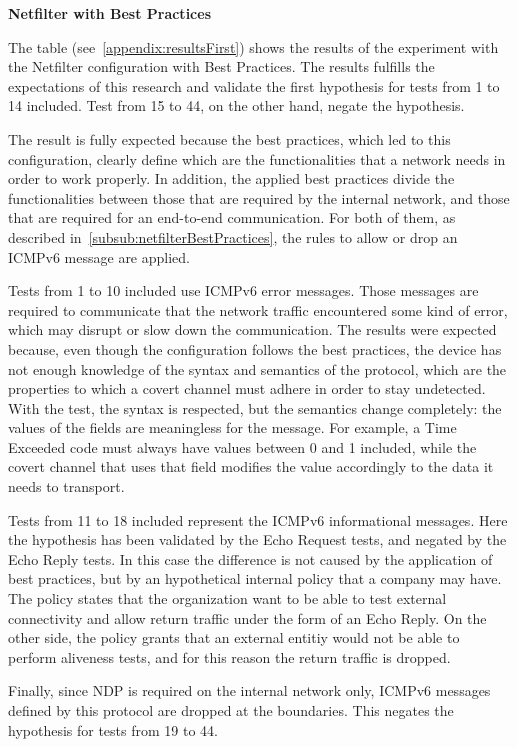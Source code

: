 \documentclass[12pt]{article}
\begin{document}
\textbf{Netfilter with Best Practices}
\label{resultsFirstNetfilterBest}

The table (see~\cref{appendix:resultsFirst}) shows the results of the experiment with the Netfilter configuration with Best Practices. The results fulfills the expectations of this research and validate the first hypothesis for tests from 1 to 14 included. Test from 15 to 44, on the other hand, negate the hypothesis.

The result is fully expected because the best practices, which led to this configuration, clearly define which are the functionalities that a network needs in order to work properly. In addition, the applied best practices divide the functionalities between those that are required by the internal network, and those that are required for an end-to-end communication. For both of them, as described in~\cref{subsub:netfilterBestPractices}, the rules to allow or drop an ICMPv6 message are applied.

Tests from 1 to 10 included use ICMPv6 error messages. Those messages are required to communicate that the network traffic encountered some kind of error, which may disrupt or slow down the communication. The results  were expected because, even though the configuration follows the best practices, the device has not enough knowledge of the syntax and semantics of the protocol, which are the properties to which a covert channel must adhere in order to stay undetected. With the test, the syntax is respected, but the semantics change completely: the values of the fields are meaningless for the message. For example, a Time Exceeded code must always have values between 0 and 1 included, while the covert channel that uses that field modifies the value accordingly to the data it needs to transport.

Tests from 11 to 18 included represent the ICMPv6 informational messages. Here the hypothesis has been validated by the Echo Request tests, and negated by the Echo Reply tests. In this case the difference is not caused by the application of best practices, but by an hypothetical internal policy that a company may have. The policy states that the organization want to be able to test external connectivity and allow return traffic under the form of an Echo Reply. On the other side, the policy grants that an external entitiy would not be able to perform aliveness tests, and for this reason the return traffic is dropped.

Finally, since NDP is required on the internal network only, ICMPv6 messages defined by this protocol are dropped at the boundaries. This negates the hypothesis for tests from 19 to 44.
\end{document}
